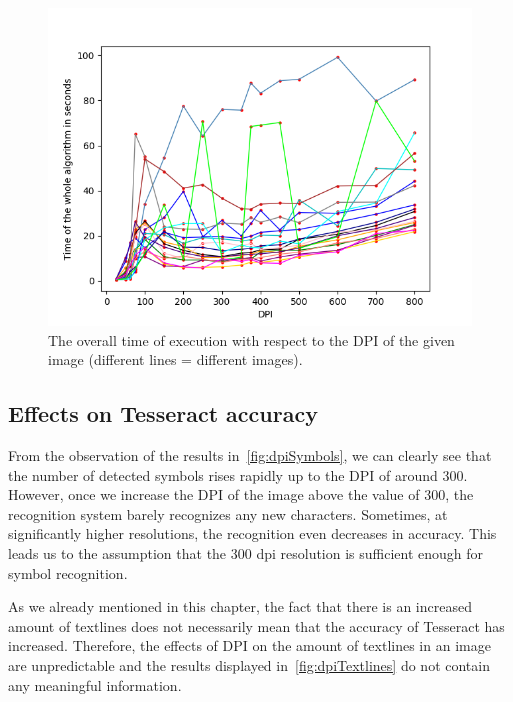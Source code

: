 \begin{figure}[t]
    \includegraphics[width=\linewidth]{img/results/dpiTimeAll.png}
    \caption{The overall time of execution with respect to the DPI of the given image (different lines = different images).}
    \label{fig:dpiAllTime}
\endminipage
\label{resultsDPITime}
\end{figure}

\subsection{Effects on Tesseract accuracy}

From the observation of the results in~\cref{fig:dpiSymbols}, we can clearly see that the number of detected symbols rises rapidly up to the DPI of around 300. However, once we increase the DPI of the image above the value of 300, the recognition system barely recognizes any new characters. Sometimes, at significantly higher resolutions, the recognition even decreases in accuracy. This leads us to the assumption that the 300 dpi resolution is sufficient enough for symbol recognition.

As we already mentioned in this chapter, the fact that there is an increased amount of textlines does not necessarily mean that the accuracy of Tesseract has increased. Therefore, the effects of DPI on the amount of textlines in an image are unpredictable and the results displayed in~\cref{fig:dpiTextlines} do not contain any meaningful information.

